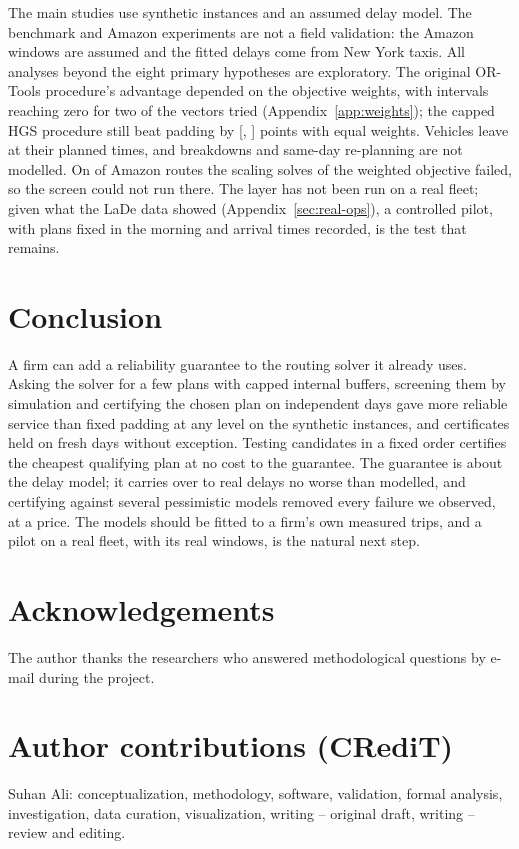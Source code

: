 \documentclass[11pt,a4paper]{article}
\theoremstyle{remark}
\newif\ifanonymous
\begin{document}
The main studies use synthetic instances and an assumed delay model. The benchmark
and Amazon experiments are not a field validation: the Amazon windows are assumed and
the fitted delays come from New York taxis. All analyses beyond the eight primary
hypotheses are exploratory. The original OR-Tools procedure's advantage depended on the
objective weights, with intervals reaching zero for two of the vectors tried
(Appendix~\ref{app:weights}); the capped HGS procedure still beat padding by \HwEqPad{}
[\HwEqPadLo, \HwEqPadHi] points with equal weights. Vehicles leave at their planned times,
and breakdowns and same-day re-planning are not modelled. On \AmzHNotRun{} of \AmzHRoutes{}
Amazon routes the scaling solves of the weighted objective failed, so the screen could
not run there. The layer has not been run on a real fleet; given what the LaDe data
showed (Appendix~\ref{sec:real-ops}), a controlled pilot, with plans fixed in the morning
and arrival times recorded, is the test that remains.

\section{Conclusion}\label{sec:conclusion}

A firm can add a reliability guarantee to the routing solver it already uses. Asking
the solver for a few plans with capped internal buffers, screening them by
simulation and certifying the chosen plan on independent days gave more reliable
service than fixed padding at any level on the synthetic instances, and certificates
held on fresh days without exception. Testing candidates in a fixed order certifies
the cheapest qualifying plan at no cost to the guarantee. The guarantee is about the
delay model; it carries over to real delays no worse than modelled, and certifying
against several pessimistic models removed every failure we observed, at a price. The models should be fitted to a
firm's own measured trips, and a pilot on a real fleet, with its real windows, is the
natural next step.

\ifanonymous\else
\section*{Acknowledgements}
The author thanks the researchers who answered methodological questions by e-mail
during the project.
\fi

\section*{Author contributions (CRediT)}
\ifanonymous The author\else Suhan Ali\fi: conceptualization, methodology, software,
validation, formal analysis, investigation, data curation, visualization, writing --
original draft, writing -- review and editing.
\end{document}
